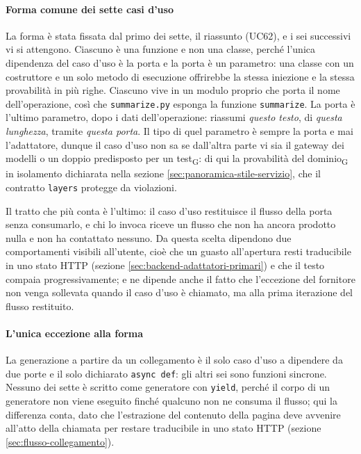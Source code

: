 \documentclass[a4paper, 10pt]{article}
\begin{document}
\paragraph{Forma comune dei sette casi d'uso}
La forma è stata fissata dal primo dei sette, il riassunto (UC62), e i sei successivi vi si attengono. Ciascuno è una funzione e non una classe, perché l'unica dipendenza del caso d'uso è la porta e la porta è un parametro: una classe con un costruttore e un solo metodo di esecuzione offrirebbe la stessa iniezione e la stessa provabilità in più righe. Ciascuno vive in un modulo proprio che porta il nome dell'operazione, così che \texttt{summarize.py} esponga la funzione \texttt{summarize}. La porta è l'ultimo parametro, dopo i dati dell'operazione: riassumi \textit{questo testo}, di \textit{questa lunghezza}, tramite \textit{questa porta}. Il tipo di quel parametro è sempre la porta e mai l'adattatore, dunque il caso d'uso non sa se dall'altra parte vi sia il gateway dei modelli o un doppio predisposto per un test\textsubscript{G}: di qui la provabilità del dominio\textsubscript{G} in isolamento dichiarata nella sezione \ref{sec:panoramica-stile-servizio}, che il contratto \texttt{layers} protegge da violazioni.

Il tratto che più conta è l'ultimo: il caso d'uso restituisce il flusso della porta senza consumarlo, e chi lo invoca riceve un flusso che non ha ancora prodotto nulla e non ha contattato nessuno. Da questa scelta dipendono due comportamenti visibili all'utente, cioè che un guasto all'apertura resti traducibile in uno stato HTTP (sezione \ref{sec:backend-adattatori-primari}) e che il testo compaia progressivamente; e ne dipende anche il fatto che l'eccezione del fornitore non venga sollevata quando il caso d'uso è chiamato, ma alla prima iterazione del flusso restituito.

\paragraph{L'unica eccezione alla forma}
La generazione a partire da un collegamento è il solo caso d'uso a dipendere da due porte e il solo dichiarato \texttt{async def}: gli altri sei sono funzioni sincrone. Nessuno dei sette è scritto come generatore con \texttt{yield}, perché il corpo di un generatore non viene eseguito finché qualcuno non ne consuma il flusso; qui la differenza conta, dato che l'estrazione del contenuto della pagina deve avvenire all'atto della chiamata per restare traducibile in uno stato HTTP (sezione \ref{sec:flusso-collegamento}).
\end{document}
